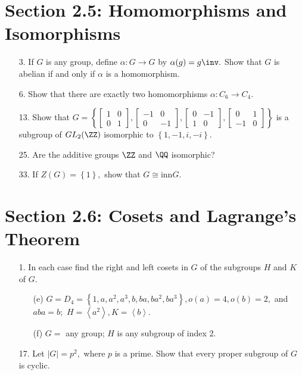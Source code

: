 \documentclass{article}
\begin{document}
\section*{Section 2.5: Homomorphisms and Isomorphisms}
\begin{itemize}
	\item[3.] If $G$ is any group, define $\alpha:G\to G$ by $\alpha(g)=g\inv.$ Show that $G$ is abelian if and only if $\alpha$ is a homomorphism.

	\item[6.] Show that there are exactly two homomorphisms $\alpha:C_6\to C_4.$

	\item[13.] Show that $G=\left\{ \begin{bmatrix}
			1 & 0 \\ 0 & 1
		\end{bmatrix}, \begin{bmatrix}
			-1 & 0 \\ 0 & -1
		\end{bmatrix}, \begin{bmatrix}
			0 & -1 \\ 1 & 0 
		\end{bmatrix}, \begin{bmatrix}
			0 & 1 \\ -1 & 0
		\end{bmatrix}\right\}$ is a subgroup of $GL_2(\ZZ)$ isomorphic to $\left\{ 1, -1, i, -i \right\}.$

	\item[25.] Are the additive groups $\ZZ$ and $\QQ$ isomorphic? 

	\item[33.] If $Z(G)=\left\{ 1 \right\},$ show that $G\cong\text{inn}G.$

\end{itemize}

\section*{Section 2.6: Cosets and Lagrange's Theorem}
\begin{itemize}
	\item[1.] In each case find the right and left cosets in $G$ of the subgroups $H$ and $K$ of $G.$ 
		\begin{itemize}
			\item[(e)] $G=D_4=\left\{ 1, a, a^2, a^3, b, ba, ba^2, ba^3 \right\}, o(a)=4, o(b)=2,$ and $aba=b;$ $H=\left< a^2\right>, K=\left< b\right>.$

			\item[(f)] $G=$ any group; $H$ is any subgroup of index 2.
				
		\end{itemize}

	\item[17.] Let $|G|=p^2,$ where $p$ is a prime. Show that every proper subgroup of $G$ is cyclic.
		
\end{itemize}
\end{document}
